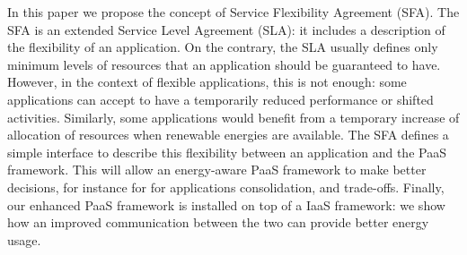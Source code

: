 In this paper we propose the concept of Service Flexibility Agreement (SFA). 
The SFA is an extended Service Level Agreement (SLA): it includes a description of the flexibility of an application.
On the contrary, the SLA usually defines only minimum levels of resources that an application should be guaranteed to have.
However, in the context of flexible applications, this is not enough: some applications can accept to have a temporarily reduced performance or shifted activities.
Similarly, some applications would benefit from a temporary increase of allocation of resources when renewable energies are available.
The SFA defines a simple interface to describe this flexibility between an application and the PaaS framework. 
This will allow an energy-aware PaaS framework to make better decisions, for instance for for applications consolidation, and trade-offs. %
Finally, our enhanced PaaS framework is installed on top of a IaaS framework: we show how an improved communication between the two can provide better energy usage.






